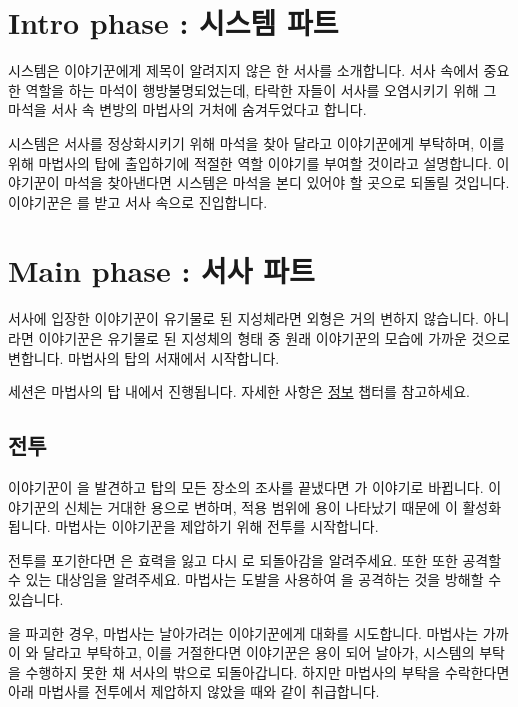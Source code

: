\documentclass{report}
\begin{document}
	\section{Intro phase : 시스템 파트}
	
	시스템은 이야기꾼에게 제목이 알려지지 않은 한 서사를 소개합니다. 서사 속에서 중요한 역할을 하는 마석이 행방불명되었는데, 타락한 자들이 서사를 오염시키기 위해 그 마석을 서사 속 변방의 마법사의 거처에 숨겨두었다고 합니다.
	
	시스템은 서사를 정상화시키기 위해 마석을 찾아 달라고 이야기꾼에게 부탁하며, 이를 위해 마법사의 탑에 출입하기에 적절한 역할 이야기를 부여할 것이라고 설명합니다. 이야기꾼이 마석을 찾아낸다면 시스템은 마석을 본디 있어야 할 곳으로 되돌릴 것입니다. 이야기꾼은 를 받고 서사 속으로 진입합니다.
	
	
	
	
	\section{Main phase : 서사 파트}
	
	서사에 입장한 이야기꾼이 유기물로 된 지성체라면 외형은 거의 변하지 않습니다. 아니라면 이야기꾼은 유기물로 된 지성체의 형태 중 원래 이야기꾼의 모습에 가까운 것으로 변합니다. 마법사의 탑의 서재에서 시작합니다.
	
	세션은 마법사의 탑 내에서 진행됩니다. 자세한 사항은 \hyperlink{tower:information}{정보} 챕터를 참고하세요.
	
	
	
	\subsection{전투}
	
	이야기꾼이 을 발견하고 탑의 모든 장소의 조사를 끝냈다면 가 이야기로 바뀝니다. 이야기꾼의 신체는 거대한 용으로 변하며, 적용 범위에 용이 나타났기 때문에 이 활성화됩니다. 마법사는 이야기꾼을 제압하기 위해 전투를 시작합니다.
	
	전투를 포기한다면 은 효력을 잃고 다시 로 되돌아감을 알려주세요. 또한 또한 공격할 수 있는 대상임을 알려주세요. 마법사는 도발을 사용하여 을 공격하는 것을 방해할 수 있습니다.
	
	을 파괴한 경우, 마법사는 날아가려는 이야기꾼에게 대화를 시도합니다. 마법사는 가까이 와 달라고 부탁하고, 이를 거절한다면 이야기꾼은 용이 되어 날아가, 시스템의 부탁을 수행하지 못한 채 서사의 밖으로 되돌아갑니다. 하지만 마법사의 부탁을 수락한다면 아래 마법사를 전투에서 제압하지 않았을 때와 같이 취급합니다.
	
\end{document}
